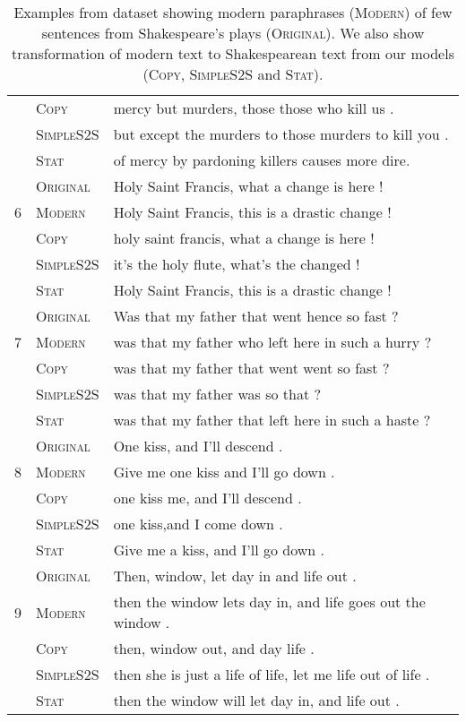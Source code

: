 \begin{table}
\begin{tabular}{|l|l|l| }
& \textsc{Copy} & mercy but murders, those those who kill us . \\  
& \textsc{SimpleS2S} & but except the murders to those murders to kill you . \\
& \textsc{Stat} & of mercy by pardoning killers causes more dire. \\ \hline \hline
\multirow{3}{*}{6} &  \textsc{Original} & Holy Saint Francis, what a change is here ! \\
& \textsc{Modern} & Holy Saint Francis, this is a drastic change !  \\
& \textsc{Copy} & holy saint francis, what a change is here ! \\  
& \textsc{SimpleS2S} & it's the holy flute, what's the changed ! \\
& \textsc{Stat} & Holy Saint Francis, this is a drastic change ! \\ \hline \hline
\multirow{3}{*}{7} &  \textsc{Original} & Was that my father that went hence so fast ?  \\
&  \textsc{Modern} & was that my father who left here in such a hurry ?  \\
& \textsc{Copy} & was that my father that went went so fast ? \\  
& \textsc{SimpleS2S} & was that my father was so that ? \\
& \textsc{Stat} & was that my father that left here in such a haste ? \\ 
\hline \hline
\multirow{3}{*}{8} &  \textsc{Original} & One kiss, and I'll descend .  \\
& \textsc{Modern} & Give me one kiss and I'll go down .  \\
& \textsc{Copy} & one kiss me, and I'll descend . \\  
& \textsc{SimpleS2S} & one kiss,and I come down . \\
& \textsc{Stat} & Give me a kiss, and I'll go down . \\ \hline \hline
\multirow{3}{*}{9} &  \textsc{Original} & Then, window, let day in and life out .  \\
&  \textsc{Modern} &  then the window lets day in, and life goes out the window .  \\
& \textsc{Copy} & then, window out, and day life . \\  
& \textsc{SimpleS2S} & then she is just a life of life, let me life out of life . \\
& \textsc{Stat} & then the window will let day in, and life out . \\ \hline
\hline
\end{tabular}
\caption{Examples from dataset showing modern paraphrases (\textsc{Modern}) of few sentences from Shakespeare's plays (\textsc{Original}). We also show transformation of modern text to Shakespearean text from our models (\textsc{Copy}, \textsc{SimpleS2S} and \textsc{Stat}).}
\label{tab:intro}
\end{table}

